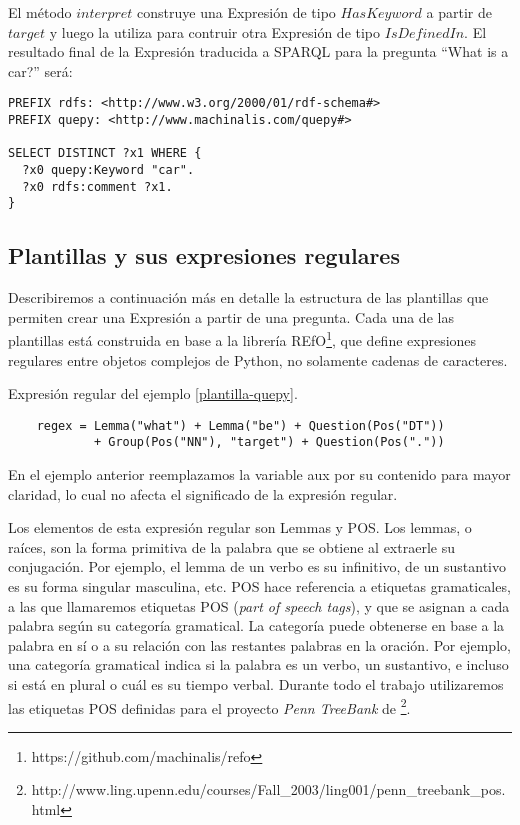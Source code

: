 El método $interpret$ construye una Expresión de tipo $HasKeyword$ a partir de $target$ y luego la utiliza para contruir otra Expresión de tipo $IsDefinedIn$. El resultado final de la Expresión traducida a SPARQL para la pregunta ``What is a car?'' será:

\vspace{5mm}

\begin{lstlisting}
PREFIX rdfs: <http://www.w3.org/2000/01/rdf-schema#>
PREFIX quepy: <http://www.machinalis.com/quepy#>

SELECT DISTINCT ?x1 WHERE {
  ?x0 quepy:Keyword "car".
  ?x0 rdfs:comment ?x1.
}
\end{lstlisting}

\vspace{5mm}

\subsection{Plantillas y sus expresiones regulares}

Describiremos a continuación más en detalle la estructura de las plantillas que permiten crear una Expresión a partir de una pregunta. Cada una de las plantillas está construida en base a la librería REfO\footnote{https://github.com/machinalis/refo}, que define expresiones regulares entre objetos complejos de Python, no solamente cadenas de caracteres.

\begin{example}\label{regex} Expresión regular del ejemplo \ref{plantilla-quepy}.
    \begin{lstlisting}
    regex = Lemma("what") + Lemma("be") + Question(Pos("DT"))
            + Group(Pos("NN"), "target") + Question(Pos("."))
    \end{lstlisting}
\end{example}

En el ejemplo anterior reemplazamos la variable aux por su contenido para mayor claridad, lo cual no afecta el significado de la expresión regular.

Los elementos de esta expresión regular son Lemmas y POS. Los lemmas, o raíces, son la forma primitiva de la palabra que se obtiene al extraerle su conjugación. Por ejemplo, el lemma de un verbo es su infinitivo, de un sustantivo es su forma singular masculina, etc. POS hace referencia a etiquetas gramaticales, a las que llamaremos etiquetas POS (\textit{part of speech tags}), y que se asignan a cada palabra según su categoría gramatical. La categoría puede obtenerse en base a la palabra en sí o a su relación con las restantes palabras en la oración. Por ejemplo, una categoría gramatical indica si la palabra es un verbo, un sustantivo, e incluso si está en plural o cuál es su tiempo verbal. Durante todo el trabajo utilizaremos las etiquetas POS definidas para el proyecto \textit{Penn TreeBank} de \citet{penntreebank}\footnote{http://www.ling.upenn.edu/courses/Fall\_2003/ling001/penn\_treebank\_pos.html}.

